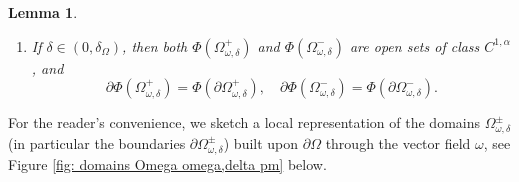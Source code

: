 \documentclass[11pt,reqno,a4paper]{amsart}
\theoremstyle{plain}
\newtheorem{lemma}[theorem]{Lemma}
\theoremstyle{definition}
\begin{document}
\begin{lemma}
\begin{enumerate}
        \item[(iv)] If $\delta \in (0,\delta_{\Omega})$, then both $\Phi(\Omega^+_{\omega,\delta})$ and $\Phi(\Omega^-_{\omega,\delta})$ are open sets of class $C^{1,\alpha}$, and 
        \begin{equation*}
            \partial \Phi(\Omega^+_{\omega,\delta}) = \Phi(\partial \Omega^+_{\omega,\delta}), \quad \partial \Phi(\Omega^-_{\omega,\delta}) = \Phi(\partial \Omega^-_{\omega,\delta}).
        \end{equation*}
    \end{enumerate}
\end{lemma}

For the reader's convenience, we sketch a local representation of the domains $\Omega^\pm_{\omega,\delta}$ (in particular the boundaries $\partial \Omega^\pm_{\omega,\delta}$) built upon $\partial\Omega$ through the vector field $\omega$, see Figure \ref{fig: domains Omega omega,delta pm} below.
\end{document}
